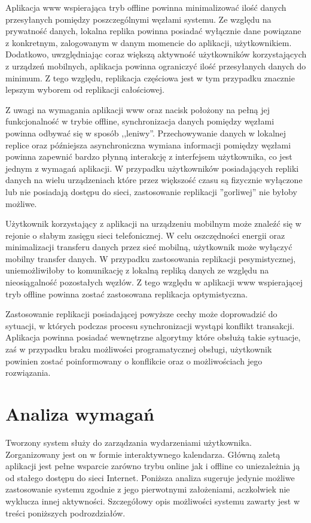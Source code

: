 Aplikacja www wspierająca tryb offline powinna minimalizować ilość danych przesyłanych pomiędzy poszczególnymi węzłami systemu. Ze względu na prywatność danych, lokalna replika powinna posiadać wyłącznie dane powiązane z konkretnym, zalogowanym w danym momencie do aplikacji, użytkownikiem. Dodatkowo, uwzględniając coraz większą aktywność użytkowników korzystających z urządzeń mobilnych, aplikacja powinna ograniczyć ilość przesyłanych danych do minimum. Z tego względu, replikacja częściowa jest w tym przypadku znacznie lepszym wyborem od replikacji całościowej.

Z uwagi na wymagania aplikacji www oraz nacisk położony na pełną jej funkcjonalność w trybie offline, synchronizacja danych pomiędzy węzłami powinna odbywać się w sposób ,,leniwy''. Przechowywanie danych w lokalnej replice oraz późniejsza asynchroniczna wymiana informacji pomiędzy węzłami powinna zapewnić bardzo płynną interakcję z interfejsem użytkownika, co jest jednym z wymagań aplikacji.  W przypadku użytkowników posiadających repliki danych na wielu urządzeniach które przez większość czasu są fizycznie wyłączone lub nie posiadają dostępu do sieci, zastosowanie replikacji ''gorliwej'' nie byłoby możliwe.

Użytkownik korzystający z aplikacji na urządzeniu mobilnym może znaleźć się w rejonie o słabym zasięgu sieci telefonicznej. W celu oszczędności energii oraz minimalizacji transferu danych przez sieć mobilną, użytkownik może wyłączyć mobilny transfer danych. W przypadku zastosowania replikacji pesymistycznej, uniemożliwiłoby to komunikację z lokalną repliką danych ze względu na nieosiągalność pozostałych węzłów. Z tego względu w aplikacji www wspierającej tryb offline powinna zostać zastosowana replikacja optymistyczna.

Zastosowanie replikacji posiadającej powyższe cechy może doprowadzić do sytuacji, w których podczas procesu synchronizacji wystąpi konflikt transakcji. Aplikacja powinna posiadać wewnętrzne algorytmy które obsłużą takie sytuacje, zaś w przypadku braku możliwości programatycznej obsługi, użytkownik powinien zostać poinformowany o konflikcie oraz o możliwościach jego rozwiązania.

\section{Analiza wymagań}
\label{sec:analizaWymagan}

Tworzony system służy do zarządzania wydarzeniami użytkownika. Zorganizowany jest on w formie interaktywnego kalendarza. Główną zaletą aplikacji jest pełne wsparcie zarówno trybu online jak i offline co uniezależnia ją od stałego dostępu do sieci Internet. Poniższa analiza sugeruje jedynie możliwe zastosowanie systemu zgodnie z jego
pierwotnymi założeniami, aczkolwiek nie wyklucza innej aktywności. Szczegółowy opis możliwości systemu zawarty jest w treści poniższych podrozdziałów.

